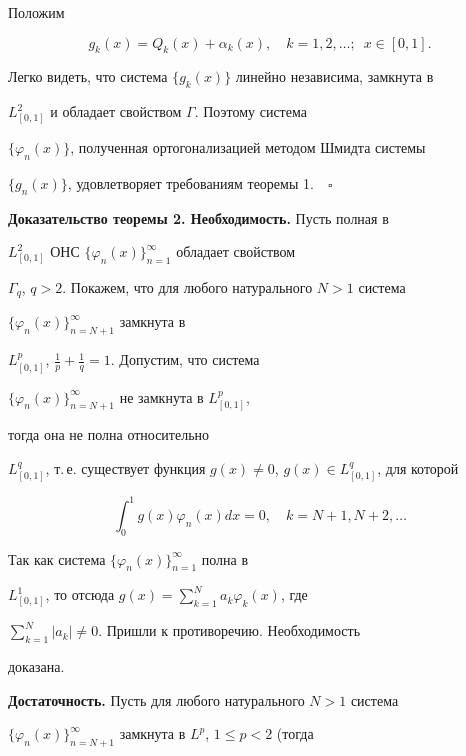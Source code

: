 Положим 


$$ 


g_k(x)=Q_k(x)+\alpha_k(x),\quad k=1,2,\dotsc;\ \; x\in[0,1]. 


$$ 


Легко видеть, что система $\{g_k(x)\}$ линейно независима, замкнута в 


$L^2_{[0,1]}$ и обладает свойством $\Gamma$. Поэтому система 


$\{\varphi_n(x)\}$, полученная ортогонализацией методом Шмидта системы 


$\{g_n(x)\}$, удовлетворяет требованиям теоремы 1.$\quad\square$ 


\medskip 


 


{\bf Доказательство теоремы 2. Необходимость.} Пусть полная в 


$L^2_{[0,1]}$ ОНС $\{\varphi_n(x)\}^\infty_{n=1}$ обладает свойством 


$\Gamma_q$, $q>2$. Покажем, что для любого натурального $N>1$ система 


$\{\varphi_n(x)\}^\infty_{n=N+1}$ замкнута в 


$L^p_{[0,1]}$, $\frac{1}{p}+\frac{1}{q}=1$. Допустим, что система 


$\{\varphi_n(x)\}^\infty_{n=N+1}$ не замкнута в $L^p_{[0,1]}$, 


тогда она не полна относительно 


$L^q_{[0,1]}$, т.\,е. существует функция $g(x)\ne0$, $g(x)\in 


L^q_{[0,1]}$, для которой 


$$ 


\int^1_0 g(x)\varphi_n(x)dx=0,\quad 


k=N+1,N+2,\dotsc 


$$ 


Так как система $\{\varphi_n(x)\}^\infty_{n=1}$ полна в 


$L^1_{[0,1]}$, то отсюда $g(x)=\sum\limits^N_{k=1}a_k\varphi_k(x)$, где 


$\sum\limits^N_{k=1}|a_k|\ne0$. Пришли к противоречию. Необходимость 


доказана. 


\medskip 


 


{\bf Достаточность.} Пусть для любого натурального $N>1$ система 


$\{\varphi_n(x)\}^\infty_{n=N+1}$ замкнута в $L^p$, $1\le p<2$ (тогда 


